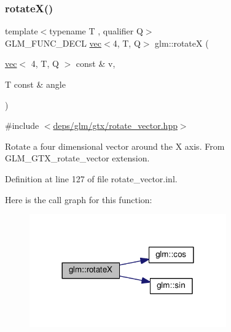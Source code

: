 \subsubsection{\texorpdfstring{rotate\+X()}{rotateX()}\hspace{0.1cm}{\footnotesize\ttfamily [2/2]}}
{\footnotesize\ttfamily template$<$typename T , qualifier Q$>$ \\
G\+L\+M\+\_\+\+F\+U\+N\+C\+\_\+\+D\+E\+CL \hyperlink{structglm_1_1vec}{vec}$<$4, T, Q$>$ glm\+::rotateX (\begin{DoxyParamCaption}\item[{\hyperlink{structglm_1_1vec}{vec}$<$ 4, T, Q $>$ const \&}]{v,  }\item[{T const \&}]{angle }\end{DoxyParamCaption})}



{\ttfamily \#include $<$\hyperlink{rotate__vector_8hpp}{deps/glm/gtx/rotate\+\_\+vector.\+hpp}$>$}

Rotate a four dimensional vector around the X axis. From G\+L\+M\+\_\+\+G\+T\+X\+\_\+rotate\+\_\+vector extension. 

Definition at line 127 of file rotate\+\_\+vector.\+inl.

Here is the call graph for this function\+:
\nopagebreak
\begin{figure}[H]
\begin{center}
\leavevmode
\includegraphics[width=240pt]{df/d02/group__gtx__rotate__vector_ga4333b1ea8ebf1bd52bc3801a7617398a_cgraph}
\end{center}
\end{figure}
\mbox{\label{group__gtx__rotate__vector_gaebdc8b054ace27d9f62e054531c6f44d}} 

